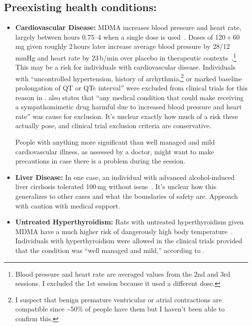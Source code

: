 \documentclass[11pt,oneside]{book}
\let\cite\parencite
\begin{document}
\subsection*{Preexisting health conditions:}
\begin{itemize}
    \item \textbf{Cardiovascular Disease:} MDMA increases blood pressure and heart rate, largely between hours 0.75--4 when a single dose is used~\cite{straumann2024racemic}. Doses of 120\,+\,60\,mg given roughly 2\,hours later increase average blood pressure by 28/12\,mmHg and heart rate by 23\,b/min over placebo in therapeutic contexts~\cite{mitchellMDMAClinicalTrial}.\footnote{Blood pressure and heart rate are averaged values from the 2nd and 3rd sessions. I excluded the 1st session because it used a different dose.} This may be a risk for individuals with cardiovascular disease. Individuals with \enquote{uncontrolled hypertension, history of arrhythmia,\footnote{I suspect that benign premature ventricular or atrial contractions are compatible since \textasciitilde50\% of people have them but I haven't been able to confirm this.} or marked baseline prolongation of QT or QTc interval} were excluded from clinical trials for this reason in \textcite[Supplementary Information; p. 5]{mitchellMDMAClinicalTrial2}. \textcite[sec. Methods]{mitchellMDMAClinicalTrial} also states that \enquote{any medical condition that could make receiving a sympathomimetic drug harmful due to increased blood pressure and heart rate} was cause for exclusion. It's unclear exactly how much of a risk these actually pose, and clinical trial exclusion criteria are conservative.

    People with anything more significant than well managed and mild cardiovascular illness, as assessed by a doctor, might want to make precautions in case there is a problem during the session.
    \item \textbf{Liver Disease:} In one case, an individual with advanced alcohol-induced liver cirrhosis tolerated 100\,mg without issue~\cite{krausCirrhosis}. It's unclear how this generalizes to other cases and what the boundaries of safety are. Approach with caution with medical support.
    \item \textbf{Untreated Hyperthyroidism:} Rats with untreated hyperthyroidism given MDMA have a much higher risk of dangerously high body temperature~\cite{shokryHyperthyroidism}. Individuals with hyperthyroidism were allowed in the clinical trials provided that the condition was \enquote{well managed and mild,} according to \textcite[Supplementary Information; p. 5]{mitchellMDMAClinicalTrial2}.
\end{itemize}
\end{document}
